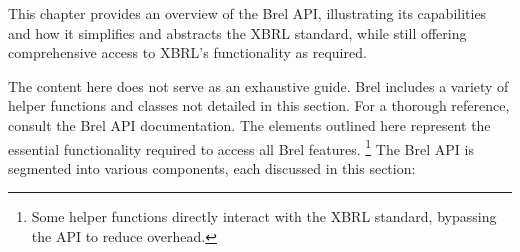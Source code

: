 This chapter provides an overview of the Brel API, 
illustrating its capabilities and how it simplifies and abstracts the XBRL standard, 
while still offering comprehensive access to XBRL's functionality as required.

The content here does not serve as an exhaustive guide. 
Brel includes a variety of helper functions and classes not detailed in this section. 
For a thorough reference, consult the Brel API documentation\cite{brel_api}. 
The elements outlined here represent the essential functionality required to access all Brel features.
\footnote{Some helper functions directly interact with the XBRL standard, bypassing the API to reduce overhead.}
The Brel API is segmented into various components, each discussed in this section:

